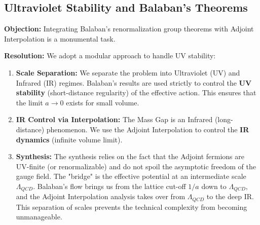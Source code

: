 \subsection{Ultraviolet Stability and Balaban's Theorems}
\label{ssec:uv-stability-response}

\textbf{Objection:} Integrating Balaban's renormalization group theorems with Adjoint Interpolation is a monumental task.

\textbf{Resolution:}
We adopt a modular approach to handle UV stability:

\begin{enumerate}
    \item \textbf{Scale Separation:}
    We separate the problem into Ultraviolet (UV) and Infrared (IR) regimes. Balaban's results are used strictly to control the \textbf{UV stability} (short-distance regularity) of the effective action. This ensures that the limit $a \to 0$ exists for small volume.

    \item \textbf{IR Control via Interpolation:}
    The Mass Gap is an Infrared (long-distance) phenomenon. We use the Adjoint Interpolation to control the \textbf{IR dynamics} (infinite volume limit).
    
    \item \textbf{Synthesis:}
    The synthesis relies on the fact that the Adjoint fermions are UV-finite (or renormalizable) and do not spoil the asymptotic freedom of the gauge field. The "bridge" is the effective potential at an intermediate scale $\Lambda_{QCD}$. Balaban's flow brings us from the lattice cut-off $1/a$ down to $\Lambda_{QCD}$, and the Adjoint Interpolation analysis takes over from $\Lambda_{QCD}$ to the deep IR. This separation of scales prevents the technical complexity from becoming unmanageable.
\end{enumerate}



